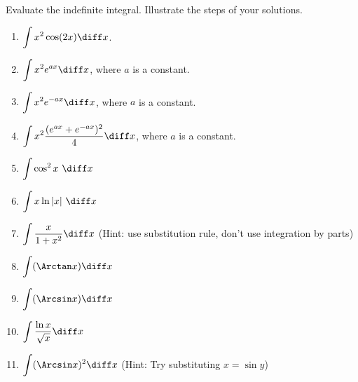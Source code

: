 Evaluate the indefinite integral. Illustrate the steps of your solutions.
\begin{multicols}{2}
\begin{enumerate}
\item $\displaystyle\int x^2\cos (2x) \diff x$.

\item 
$\displaystyle\int x^2e^{a x} \diff x$, where $a$ is a constant.

\item 
$\displaystyle\int x^2e^{-ax}\diff x$, where $a$ is a constant.

\item \label{eqA}
$\displaystyle\int x^2\frac{(e^{ax}+e^{-ax})^2}4\diff x$, where $a$ is a constant. 

\item 
$\displaystyle\int \cos^2x ~ \diff x$ 

\item 
$\displaystyle \int x\ln |x|  ~ \diff x $

\item $\displaystyle\int \frac{x}{1+x^2} \diff x$  (Hint: use substitution rule, don't use integration by parts)

\item 
$\displaystyle \int (\Arctan x) \diff x$

\item 
$\displaystyle \int (\Arcsin x) \diff x
$
\item $\displaystyle\int \frac{\ln x}{\sqrt{x}}\diff x $
\item \label{problemIntegrateArcsinSquared} $\displaystyle\int (\Arcsin x)^2 \diff x $ \quad \quad (Hint: Try substituting $x=\sin y$)


\end{enumerate}
\end{multicols}
